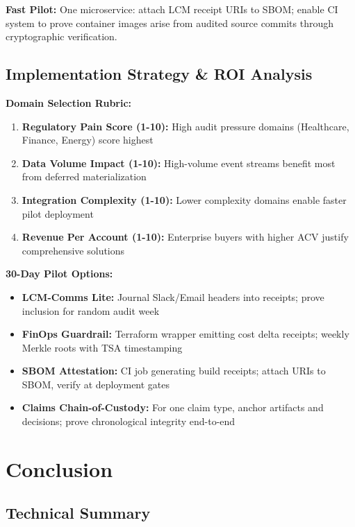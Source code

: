 \documentclass[12pt,a4paper]{article}
\begin{document}
\textbf{Fast Pilot:} One microservice: attach LCM receipt URIs to SBOM; enable CI system to prove container images arise from audited source commits through cryptographic verification.

\subsection{Implementation Strategy \& ROI Analysis}

\begin{technicalbox}
\textbf{Domain Selection Rubric:}

\begin{enumerate}
\item \textbf{Regulatory Pain Score (1-10):} High audit pressure domains (Healthcare, Finance, Energy) score highest
\item \textbf{Data Volume Impact (1-10):} High-volume event streams benefit most from deferred materialization
\item \textbf{Integration Complexity (1-10):} Lower complexity domains enable faster pilot deployment
\item \textbf{Revenue Per Account (1-10):} Enterprise buyers with higher ACV justify comprehensive solutions
\end{enumerate}

\textbf{30-Day Pilot Options:}
\begin{itemize}
\item \textbf{LCM-Comms Lite:} Journal Slack/Email headers into receipts; prove inclusion for random audit week
\item \textbf{FinOps Guardrail:} Terraform wrapper emitting cost delta receipts; weekly Merkle roots with TSA timestamping
\item \textbf{SBOM Attestation:} CI job generating build receipts; attach URIs to SBOM, verify at deployment gates
\item \textbf{Claims Chain-of-Custody:} For one claim type, anchor artifacts and decisions; prove chronological integrity end-to-end
\end{itemize}
\end{technicalbox}

\section{Conclusion}

\subsection{Technical Summary}
\end{document}
